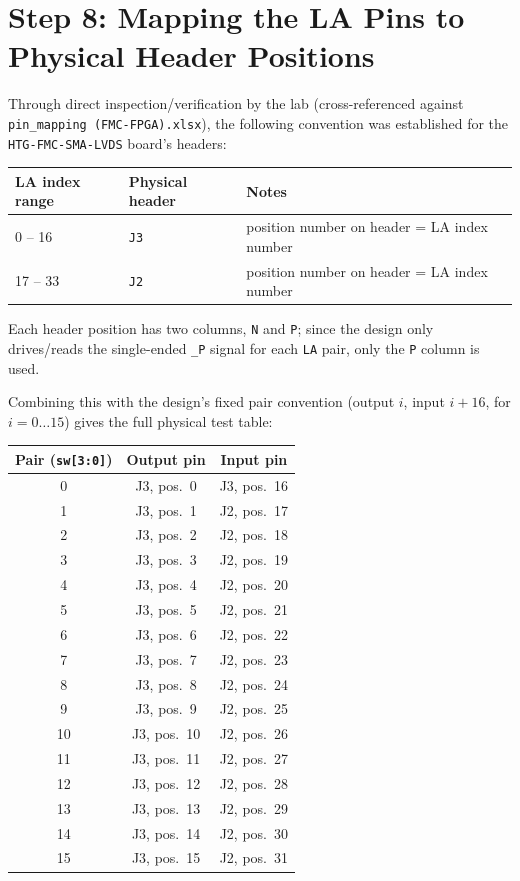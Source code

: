 \documentclass[11pt]{article}
\begin{document}
\section{Step 8: Mapping the LA Pins to Physical Header Positions}

Through direct inspection/verification by the lab (cross-referenced against
\texttt{pin\_mapping (FMC-FPGA).xlsx}), the following convention was established for the
\texttt{HTG-FMC-SMA-LVDS} board's headers:

\begin{center}
\begin{tabular}{@{}lll@{}}
\toprule
\textbf{LA index range} & \textbf{Physical header} & \textbf{Notes} \\
\midrule
0 -- 16 & \texttt{J3} & position number on header = LA index number \\
17 -- 33 & \texttt{J2} & position number on header = LA index number \\
\bottomrule
\end{tabular}
\end{center}

Each header position has two columns, \texttt{N} and \texttt{P}; since the design only
drives/reads the single-ended \texttt{\_P} signal for each \texttt{LA} pair, only the
\texttt{P} column is used.

Combining this with the design's fixed pair convention (output $i$, input $i{+}16$,
for $i = 0\ldots15$) gives the full physical test table:

\begin{center}
\begin{tabular}{@{}ccc@{}}
\toprule
\textbf{Pair (\texttt{sw[3:0]})} & \textbf{Output pin} & \textbf{Input pin} \\
\midrule
0  & J3, pos.\ 0  & J3, pos.\ 16 \\
1  & J3, pos.\ 1  & J2, pos.\ 17 \\
2  & J3, pos.\ 2  & J2, pos.\ 18 \\
3  & J3, pos.\ 3  & J2, pos.\ 19 \\
4  & J3, pos.\ 4  & J2, pos.\ 20 \\
5  & J3, pos.\ 5  & J2, pos.\ 21 \\
6  & J3, pos.\ 6  & J2, pos.\ 22 \\
7  & J3, pos.\ 7  & J2, pos.\ 23 \\
8  & J3, pos.\ 8  & J2, pos.\ 24 \\
9  & J3, pos.\ 9  & J2, pos.\ 25 \\
10 & J3, pos.\ 10 & J2, pos.\ 26 \\
11 & J3, pos.\ 11 & J2, pos.\ 27 \\
12 & J3, pos.\ 12 & J2, pos.\ 28 \\
13 & J3, pos.\ 13 & J2, pos.\ 29 \\
14 & J3, pos.\ 14 & J2, pos.\ 30 \\
15 & J3, pos.\ 15 & J2, pos.\ 31 \\
\bottomrule
\end{tabular}
\end{center}
\end{document}
